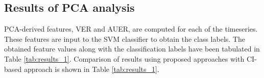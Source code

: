 \documentclass[journal]{IEEEtran}
\begin{document}
	
	

	
	\subsection{Results of PCA analysis}
	
	
	
	
	PCA-derived features, VER and AUER, are computed for each of the timeseries. These features are input to the SVM classifier to obtain the class labels. The obtained feature values along with  the classification labels have been tabulated in Table \ref{tab:results_1}.
	Comparison of results using proposed approaches with CI-based approach \cite{Adegoke2018} is shown in Table \ref{tab:results_1}.
\end{document}
